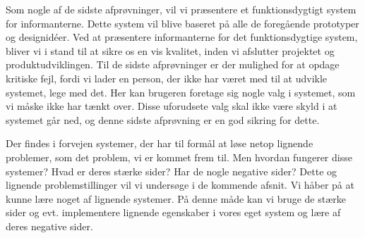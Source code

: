 Som nogle af de sidste afprøvninger, vil vi præsentere et funktionsdygtigt system for informanterne. Dette system vil blive baseret på alle de foregående prototyper og designidéer. Ved at præsentere informanterne for det funktionsdygtige system, bliver vi i stand til at sikre os en vis kvalitet, inden vi afslutter projektet og produktudviklingen. Til de sidste afprøvninger er der mulighed for at opdage kritiske fejl, fordi vi lader en person, der ikke har været med til at udvikle systemet, lege med det. Her kan brugeren foretage sig nogle valg i systemet, som vi måske ikke har tænkt over. Disse uforudsete valg skal ikke være skyld i at systemet går ned, og denne sidste afprøvning er en god sikring for dette. 

Der findes i forvejen systemer, der har til formål at løse netop lignende problemer, som det problem, vi er kommet frem til. 
Men hvordan fungerer disse systemer? 
Hvad er deres stærke sider? 
Har de nogle negative sider? 
Dette og lignende problemstillinger vil vi undersøge i de kommende afsnit. Vi håber på at kunne lære noget af lignende systemer. 
På denne måde kan vi bruge de stærke sider og evt. implementere lignende egenskaber i vores eget system og lære af deres negative sider.